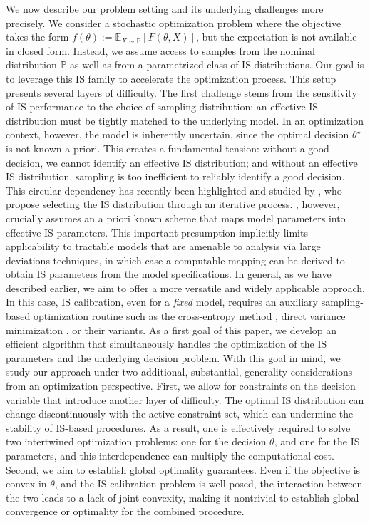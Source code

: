 \documentclass[11pt,a4paper]{article}
\theoremstyle{definition}
\begin{document}
We now describe our problem setting and its underlying challenges more precisely. We consider a stochastic optimization problem where the objective takes the form $f(\theta) := \mathbb{E}_{X \sim \mathbb{P}}[F(\theta, X)]$, but the expectation is not available in closed form. Instead, we assume access to samples from the nominal distribution $\mathbb P$ as well as from a parametrized class of IS distributions. Our goal is to leverage this IS family to accelerate the optimization process. This setup presents several layers of difficulty. The first challenge stems from the sensitivity of IS performance to the choice of sampling distribution: an effective IS distribution must be tightly matched to the underlying model. In an optimization context, however, the model is inherently uncertain, since the optimal decision $\theta^\star$ is not known a priori. This creates a fundamental tension: without a good decision, we cannot identify an effective IS distribution; and without an effective IS distribution, sampling is too inefficient to reliably identify a good decision. This circular dependency has recently been highlighted and studied by \citet{he2023adaptive}, who propose selecting the IS distribution through an iterative process. \citet{he2023adaptive}, however, crucially assumes an a priori known scheme that maps model parameters into effective IS parameters. This important presumption implicitly limits applicability to tractable models that are amenable to analysis via large deviations techniques, in which case a computable mapping can be derived to obtain IS parameters from the model specifications. In general, as we have described earlier, we aim to offer a more versatile and widely applicable approach. In this case, IS calibration, even for a \emph{fixed} model, requires an auxiliary sampling-based optimization routine such as the cross-entropy method \cite{deboer2005tutorial}, direct variance minimization \cite{owen2000safe}, or their variants. As a first goal of this paper, we develop an efficient algorithm that simultaneously handles the optimization of the IS parameters and the underlying decision problem. With this goal in mind, we study our approach under two additional, substantial, generality considerations from an optimization perspective. First, we allow for constraints on the decision variable that introduce another layer of difficulty. The optimal IS distribution can change discontinuously with the active constraint set, which can undermine the stability of IS-based procedures. As a result, one is effectively required to solve two intertwined optimization problems: one for the decision $\theta$, and one for the IS parameters, and this interdependence can multiply the computational cost. Second, we aim to establish global optimality guarantees. Even if the objective is convex in $\theta$, and the IS calibration problem is well-posed, the interaction between the two leads to a lack of joint convexity, making it nontrivial to establish global convergence or optimality for the combined procedure.
\end{document}
